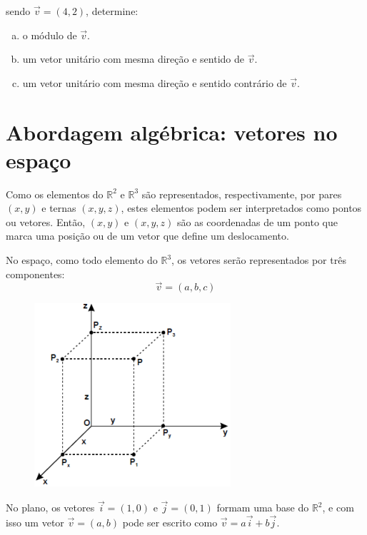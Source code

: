 \begin{exemplo} sendo $\vec{v}=(4, 2)$, determine:

\begin{enumerate}[a)]
 \item o módulo de $\vec{v}$. \vspace{1cm}
 \item um vetor unitário com mesma direção e sentido de $\vec{v}$. \vspace{1cm}
 \item um vetor unitário com mesma direção e sentido contrário de $\vec{v}$. \vspace{2cm}
\end{enumerate}
\end{exemplo}

\section{Abordagem algébrica: vetores no espaço}

Como os elementos do $\mathbb{R}^2$ e $\mathbb{R}^3$ são representados, respectivamente, por pares $(x,y)$ e ternas $(x,y,z)$, estes elementos podem ser interpretados como pontos ou vetores. Então, $(x,y)$ e $(x,y,z)$ são as coordenadas de um ponto que marca uma posição ou de um vetor que define um deslocamento.

No espaço, como todo elemento do $\mathbb{R}^3$, os vetores serão representados por três componentes: $$\vec v=(a,b,c)$$

\begin{figure}[H]
\centering
\includegraphics[scale=0.7]{analitica/imagens/vetor-r3-3.png}
\end{figure}

No plano, os vetores $\vec i=(1,0)$ e $\vec j=(0,1)$ formam uma base do $\mathbb{R}^2$, e com isso um vetor $\vec v=(a,b)$ pode ser escrito como $\vec v=a\vec i+b\vec j$.

